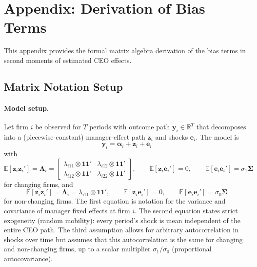 \documentclass[11pt,a4paper]{article}
\begin{document}
\clearpage
\appendix
\renewcommand{\thefigure}{A\arabic{figure}}
\renewcommand{\thetable}{A\arabic{table}}
\setcounter{figure}{0}
\setcounter{table}{0}


\section{Appendix: Derivation of Bias Terms}
This appendix provides the formal matrix algebra derivation of the bias terms in second moments of estimated CEO effects.

\subsection{Matrix Notation Setup}

\paragraph{Model setup.} Let firm $i$ be observed for $T$ periods with outcome path $\mathbf y_i\in\mathbb R^T$ that decomposes into a (piecewise-constant) manager-effect path $\mathbf z_i$ and shocks $\mathbf e_i$. The model is
\begin{equation}
\mathbf y_i = \mathbf \alpha_i + \mathbf z_i + \mathbf e_i
\end{equation}
with 
\begin{equation}
\mathbb E[\mathbf z_i\mathbf z_i']= \mathbf \Lambda_i=
\begin{bmatrix}
  \lambda_{i11}\otimes \mathbf{11}' & \lambda_{i12}\otimes \mathbf{11}'\\
  \lambda_{i12}\otimes \mathbf{11}' & \lambda_{i22}\otimes \mathbf{11}'
\end{bmatrix},
\qquad \mathbb E[\mathbf z_i\mathbf e_i']=0,
\qquad \mathbb E[\mathbf e_i\mathbf e_i']=\sigma_1\mathbf\Sigma
\end{equation}
for changing firms, and 
\begin{equation}
\mathbb E[\mathbf z_i\mathbf z_i']= \mathbf \Lambda_i=
  \lambda_{i11}\otimes \mathbf{11}',
\qquad \mathbb E[\mathbf z_i\mathbf e_i']=0,
\qquad \mathbb E[\mathbf e_i\mathbf e_i']=\sigma_0\mathbf\Sigma
\end{equation}
for non-changing firms. The first equation is notation for the variance and covariance of manager fixed effects at firm $i$. The second equation states strict exogeneity (random mobility): every period's shock is mean independent of the entire CEO path. The third assumption allows for arbitrary autocorrelation in shocks over time but assumes that this autocorrelation is the same for changing and non-changing firms, up to a scalar multiplier $\sigma_1/\sigma_0$ (proportional autocovariance).
\end{document}
